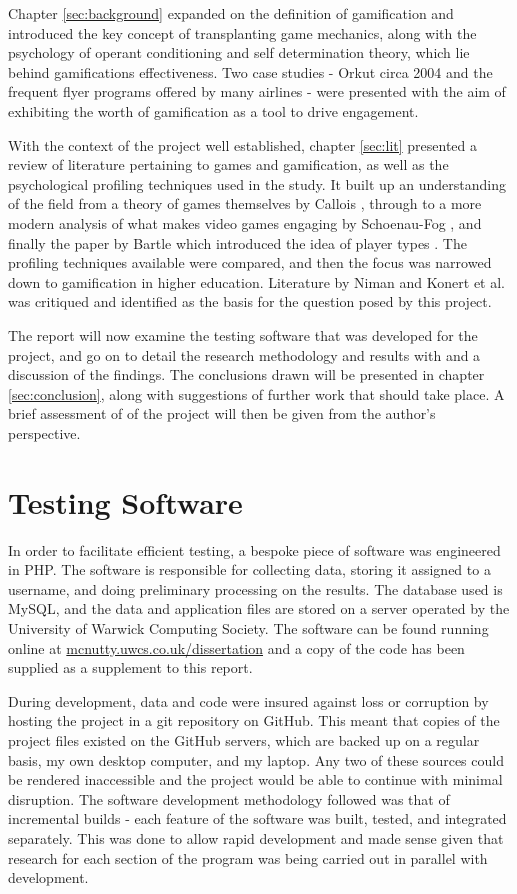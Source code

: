 \documentclass[12pt,a4paper,twoside]{report}
\begin{document}
Chapter \ref{sec:background} expanded on the definition of gamification and introduced the key concept of transplanting game mechanics, along with the psychology of operant conditioning and self determination theory, which lie behind gamifications effectiveness. Two case studies - Orkut circa 2004 and the frequent flyer programs offered by many airlines - were presented with the aim of exhibiting the worth of gamification as a tool to drive engagement.

With the context of the project well established, chapter \ref{sec:lit} presented a review of literature pertaining to games and gamification, as well as the psychological profiling techniques used in the study. It built up an understanding of the field from a theory of games themselves by Callois \cite{caillois1961man}, through to a more modern analysis of what makes video games engaging by Schoenau-Fog \cite{schoenau2011player}, and finally the paper by Bartle which introduced the idea of player types \cite{bartle1996hearts}. The profiling techniques available were compared, and then the focus was narrowed down to gamification in higher education. Literature by Niman \cite{niman2014gamification} and Konert et al. \cite{konertmodeling} was critiqued and identified as the basis for the question posed by this project.

The report will now examine the testing software that was developed for the project, and go on to detail the research methodology and results with and a discussion of the findings. The conclusions drawn will be presented in chapter \ref{sec:conclusion}, along with suggestions of further work that should take place. A brief assessment of of the project will then be given from the author's perspective.

\chapter{Testing Software}
\label{sec:software}
In order to facilitate efficient testing, a bespoke piece of software was engineered in PHP. The software is responsible for collecting data, storing it assigned to a username, and doing preliminary processing on the results. The database used is MySQL, and the data and application files are stored on a server operated by the University of Warwick Computing Society. The software can be found running online at \url{mcnutty.uwcs.co.uk/dissertation} and a copy of the code has been supplied as a supplement to this report.

During development, data and code were insured against loss or corruption by hosting the project in a git repository on GitHub. This meant that copies of the project files existed on the GitHub servers, which are backed up on a regular basis, my own desktop computer, and my laptop. Any two of these sources could be rendered inaccessible and the project would be able to continue with minimal disruption. The software development methodology followed was that of incremental builds - each feature of the software was built, tested, and integrated separately. This was done to allow rapid development and made sense given that research for each section of the program was being carried out in parallel with development.
\end{document}
